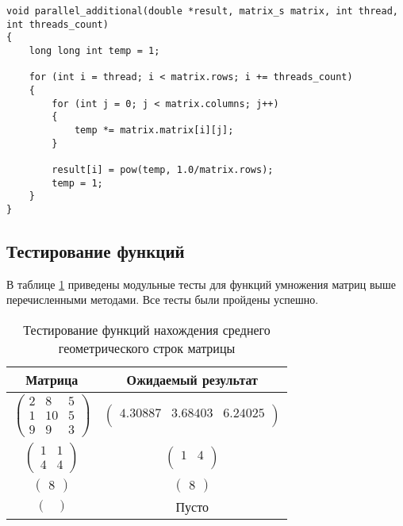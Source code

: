 \begin{center}
\captionsetup{justification=raggedright,singlelinecheck=off}
\begin{lstlisting}[caption=Функция параллельного нахождения среднего геометрического строк матрицы, label=list:vinograd, language={}]
void parallel_additional(double *result, matrix_s matrix, int thread, int threads_count)
{
    long long int temp = 1;

    for (int i = thread; i < matrix.rows; i += threads_count)
    {
        for (int j = 0; j < matrix.columns; j++)
        {
            temp *= matrix.matrix[i][j];
        }

        result[i] = pow(temp, 1.0/matrix.rows);
        temp = 1;
    }
}
\end{lstlisting}
\end{center}

\subsection{Тестирование функций}

В таблице \ref{tab:tests} приведены модульные тесты для функций умножения матриц выше перечисленными методами. Все тесты были пройдены успешно. \\

\begin{table}[ht]
    \caption{\centering Тестирование функций нахождения среднего геометрического строк матрицы}
    \centering
    \begin{tabular}{|c|c|}
    \hline
    Матрица & Ожидаемый результат \\ \hline
    $\begin{pmatrix}
        2 & 8 & 5 \\
        1 & 10 & 5 \\
        9 & 9 & 3
    \end{pmatrix}$
    &$\begin{pmatrix}
        4.30887 & 3.68403 & 6.24025 \\
    \end{pmatrix}$\\
    \hline
    $\begin{pmatrix}
        1 & 1 \\
        4 & 4
    \end{pmatrix}$
    &$\begin{pmatrix}
        1 & 4 \\
    \end{pmatrix}$\\
    \hline
    $\begin{pmatrix}
        8
    \end{pmatrix}$
    &$\begin{pmatrix}
        8
    \end{pmatrix}$\\
    \hline
    $\begin{pmatrix}
        \\
    \end{pmatrix}$
    &Пусто\\
    \hline
    \end{tabular}
    \label{tab:tests}
    \end{table}

